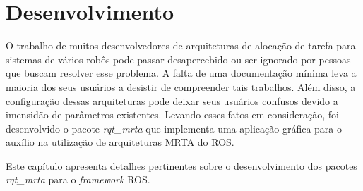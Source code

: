 \chapter[Desenvolvimento]{Desenvolvimento} \label{cap:desenvolvimento}
    O trabalho de muitos desenvolvedores de arquiteturas de alocação de tarefa para sistemas de vários robôs pode passar desapercebido ou ser ignorado por pessoas que buscam resolver esse problema. A falta de uma documentação mínima leva a maioria dos seus usuários a desistir de compreender tais trabalhos. Além disso, a configuração dessas arquiteturas pode deixar seus usuários confusos devido a imensidão de parâmetros existentes. Levando esses fatos em consideração, foi desenvolvido o pacote \textit{rqt\_mrta} que implementa uma aplicação gráfica para o auxílio na utilização de arquiteturas MRTA do ROS.
        
    Este capítulo apresenta detalhes pertinentes sobre o desenvolvimento dos pacotes \textit{rqt\_mrta} para o \textit{framework} ROS.
    
